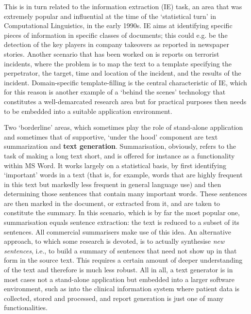 \begin{multicols}{2}

This is in turn related to the information extraction (IE) task, an area that was extremely popular and influential at the time of the ‘statistical turn’ in Computational Linguistics, in the early 1990s. IE aims at identifying specific pieces of information in specific classes of documents; this could e.g. be the detection of the key players in company takeovers as reported in newspaper stories. Another scenario that has been worked on is reports on terrorist incidents, where the problem is to map the text to a template specifying the perpetrator, the target, time and location of the incident, and the results of the incident. Domain-specific template-filling is the central characteristic of IE, which for this reason is another example of a ‘behind the scenes’ technology that constitutes a well-demarcated research area but for practical purposes then needs to be embedded into a suitable application environment. 

Two ‘borderline’ areas, which sometimes play the role of stand-alone application and sometimes that of supportive, ‘under the hood’ component are %
text summariza\-tion and \textbf{text generation}. Summarisation, obviously, refers to the task of making a long text short, and is offered for instance as a functionality within MS Word. It works largely on a statistical basis, by first identifying ‘important’ words in a text (that is, for example, words that are highly frequent in this text but markedly less frequent in general language use) and then determining those sentences that contain many important words. These sentences are then marked in the document, or extracted from it, and are taken to constitute the summary. In this scenario, which is by far the most popular one, summarisation equals sentence extraction: the text is reduced to a subset of its sentences. All commercial summarisers make use of this idea. An alternative approach, to which some research is devoted, is to actually synthesise \textit{new sentences}, i.e., to build a summary of sentences that need not show up in that form in the source text. This requires a certain amount of deeper understanding of the text and therefore is much less robust. All in all, a text generator is in most cases not a stand-alone application but embedded into a larger software environment, such as into the clinical information system where patient data is collected, stored and processed, and report generation is just one of many functionalities.


\end{multicols}
